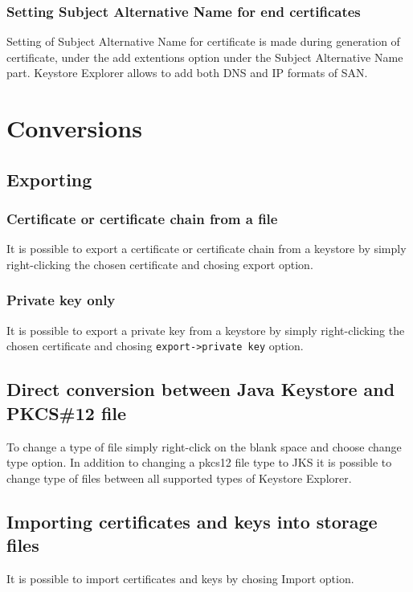 \documentclass[10pt, a4paper]{report}
\begin{document}
    \subsubsection{Setting Subject Alternative Name for end certificates}
Setting of Subject Alternative Name for certificate is made during generation of certificate, under the add extentions option under the Subject Alternative Name part. Keystore Explorer allows to add both DNS and IP formats of SAN.

\section{Conversions}

  \subsection{Exporting}
  
    \subsubsection{Certificate or certificate chain from a file}
It is possible to export a certificate or certificate chain from a keystore by simply right-clicking the chosen certificate and chosing export option.

    \subsubsection{Private key only}
It is possible to export a private key from a keystore by simply right-clicking the chosen certificate and chosing \verb+export->private key+ option.

  \subsection{Direct conversion between Java Keystore and PKCS\#12 file}
To change a type of file simply right-click on the blank space and choose change type option. In addition to changing a pkcs12 file type to JKS it is possible to change type of files between all supported types of Keystore Explorer.
  
  \subsection{Importing certificates and keys into storage files}
It is possible to import certificates and keys by chosing Import option.
\end{document}
